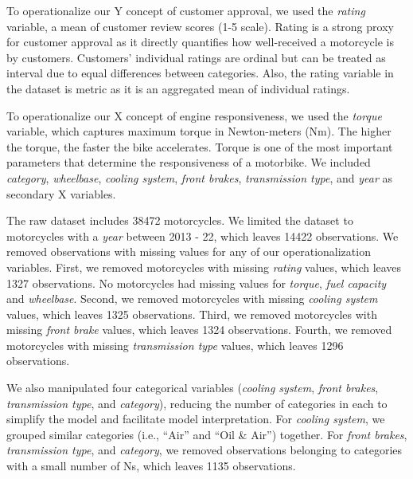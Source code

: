 \documentclass[
]{article}
\begin{document}
To operationalize our Y concept of customer approval, we used the
\emph{rating} variable, a mean of customer review scores (1-5 scale). Rating
is a strong proxy for customer approval as it directly quantifies how
well-received a motorcycle is by customers. Customers' individual
ratings are ordinal but can be treated as interval due to equal
differences between categories. Also, the rating variable in the dataset
is metric as it is an aggregated mean of individual ratings.

To operationalize our X concept of engine responsiveness, we used the
\emph{torque} variable, which captures maximum torque in Newton-meters (Nm).
The higher the torque, the faster the bike accelerates. Torque is one of
the most important parameters that determine the responsiveness of a
motorbike. We included \emph{category}, \emph{wheelbase}, \emph{cooling system}, \emph{front
brakes}, \emph{transmission type}, and \emph{year} as secondary X variables.

The raw dataset includes 38472 motorcycles. We limited the
dataset to motorcycles with a \emph{year} between 2013 - 22, which leaves
14422 observations. We removed observations with missing
values for any of our operationalization variables. First, we removed
motorcycles with missing \emph{rating} values, which leaves
1327 observations. No motorcycles had missing values for
\emph{torque}, \emph{fuel capacity} and \emph{wheelbase}. Second, we removed
motorcycles with missing \emph{cooling system} values, which leaves
1325 observations. Third, we removed motorcycles
with missing \emph{front brake} values, which leaves
1324 observations. Fourth, we removed motorcycles
with missing \emph{transmission type} values, which leaves
1296 observations.

We also manipulated four categorical variables (\emph{cooling system}, \emph{front
brakes}, \emph{transmission type}, and \emph{category}), reducing the number of
categories in each to simplify the model and facilitate model
interpretation. For \emph{cooling system}, we grouped similar categories
(i.e., ``Air'' and ``Oil \& Air'') together. For \emph{front brakes},
\emph{transmission type}, and \emph{category}, we removed observations belonging
to categories with a small number of Ns, which leaves
1135 observations.
\end{document}
